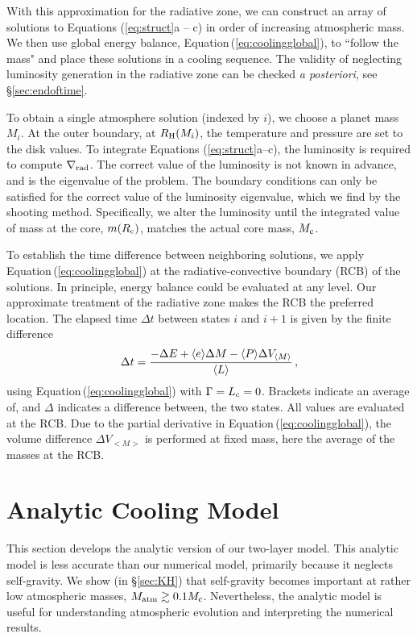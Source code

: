 \documentclass[apj, numberedappendix]{emulateapj}
\newcommand{\brak}[1]{\langle #1\rangle}
\newcommand{\Eq}[1]{Equation\,(\ref{#1})}
\newcommand{\delrad}{\nabla_{\rm rad}}
\newcommand{\RH}{R_{\rm H}}
\newcommand{\co}{_{\rm c}}
\begin{document}
With this approximation for the radiative zone, we can construct an array of solutions to Equations (\ref{eq:struct}a -- c) in order of increasing atmospheric mass.  We then use global energy balance, \Eq{eq:coolingglobal}, to ``follow the mass" and place these solutions in a cooling sequence.  The validity of neglecting luminosity generation in the radiative zone can be checked \emph{a posteriori}, see \S\ref{sec:endoftime}.

To obtain a single atmosphere solution (indexed by $i$), we choose a planet mass $M_i$.  At the outer boundary, at $\RH(M_i)$, the temperature and pressure are set to the disk values.  To integrate Equations (\ref{eq:struct}a--c), the luminosity is required to compute $\delrad$.  The correct value of the luminosity is not known in advance, and is the eigenvalue of the problem.  The boundary conditions can only be satisfied for the correct value of the luminosity eigenvalue, which we find by the shooting method.  Specifically, we alter the luminosity until the integrated value of mass at the core, $m(R\co)$, matches the actual core mass, $M\co$.

To establish the time difference between neighboring solutions, we apply \Eq{eq:coolingglobal} at the radiative-convective boundary (RCB) of the solutions.  In principle, energy balance could be evaluated at any level.  Our approximate treatment of the radiative zone makes the RCB  the preferred location.     The elapsed time $\Delta t$  between states $i$ and $i +1$ is given by the finite difference
\begin{equation}
\label{eq:dti}
\Delta t = %
{ -\Delta E + \brak{e} \Delta M - \brak{P}  \Delta V_{\brak{M}} \over \brak{L} }\, ,
\end{equation} 
using \Eq{eq:coolingglobal} with $\Gamma = L\co = 0$.
Brackets indicate an average of, and $\Delta$ indicates a difference between, the two states.  All values are evaluated at the RCB.  Due to the partial derivative in \Eq{eq:coolingglobal}, the volume difference $\Delta V_{<M>}$ is performed at fixed mass, here the average of the masses at the RCB.  



\section{Analytic Cooling Model}
\label{sec:coolingan}

This section develops the analytic version of our two-layer model. This analytic model is less accurate than our numerical model, primarily because it neglects self-gravity.  We show (in \S\ref{sec:KH}) that self-gravity becomes important at rather low atmospheric masses, $M_{\rm atm} \gtrsim 0.1 M\co$.  Nevertheless, the analytic model is useful for understanding atmospheric evolution and interpreting the numerical results.
\end{document}
